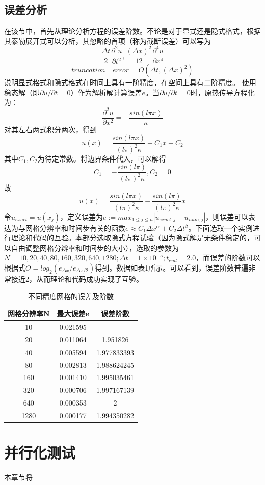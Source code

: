 \documentclass{article}
\begin{document}
		\subsection{误差分析}
		在该节中，首先从理论分析方程的误差阶数。不论是对于显式还是隐式格式，根据其泰勒展开式可以分析，其忽略的首项（称为截断误差）可以写为
		$$
		\frac{\Delta t}{2}\frac{\partial ^2u}{\partial t^2},\frac{(\Delta x)^2}{12}\frac{\partial ^4u}{\partial x^4}
		$$
		$$
		truncation \quad error=O(\Delta t,(\Delta x)^2)
		$$
		说明显式格式和隐式格式在时间上具有一阶精度，在空间上具有二阶精度。
		使用稳态解（即$\partial u /\partial t =0$）作为解析解计算误差$e$。当$\partial u /\partial t =0$时，原热传导方程化为：
		$$
		\frac{\partial^2 u}{\partial x^2}=-\frac{sin(l\pi x)}{\kappa}
		$$
		对其左右两式积分两次，得到
		$$
		u(x)=\frac{sin(l\pi x)}{(l\pi)^2\kappa}+C_1x+C_2
		$$
		其中$C_1,C_2$为待定常数。将边界条件代入，可以解得
		$$
		C_1=-\frac{sin(l\pi)}{(l\pi)^2\kappa},C_2=0
		$$
		故
		$$
		u(x)=\frac{sin(l\pi x)}{(l\pi)^2\kappa}-\frac{sin(l\pi)}{(l\pi)^2\kappa}x
		$$
		令$u_{exact}=u(x_j)$，定义误差为$e:=max_{1\leq j \leq n}|u_{exact,j}-u_{num,j}|$，则误差可以表达为与网格分辨率和时间步有关的函数$e \approx C_1\Delta x^{\alpha}+C_2\Delta t^{\beta}$。下面选取一个实例进行理论和代码的互验。本部分选取隐式方程试验（因为隐式解是无条件稳定的，可以自由调整网格分辨率和时间步的大小），选取的参数为$N=10,20,40,80,160,320,640,1280;\Delta t=1\times10^{-5};t_{end}=2.0$，而误差的阶数可以根据式$O=log_2(e_{\Delta x}/e_{\Delta x/2})$得到。数据如表1所示。可以看到，误差阶数普遍非常接近2，从而理论和代码成功实现了互验。
		\begin{table}[h]
			\centering
			\caption{不同精度网格的误差及阶数}\label{tab:aStrangeTable}%
			\begin{tabular}{ccc}
				\toprule  %
				网格分辨率N &最大误差e & 误差阶数 \\
				\midrule  %
				
				10	& 0.021595 & -       \\
				20	& 0.011064 & 1.951826 \\
				40	& 0.005594 & 1.977833393 \\
				80	& 0.002813 & 1.988624245 \\
				160	& 0.001410 & 1.995035461 \\
				320	& 0.000706 & 1.997167139 \\
				640	& 0.000353 & 2 \\
				1280& 0.000177 & 1.994350282 \\
				
				\bottomrule %
			\end{tabular}
		\end{table}
		
		
		\section{并行化测试}
		
		本章节将
		
\end{document}
